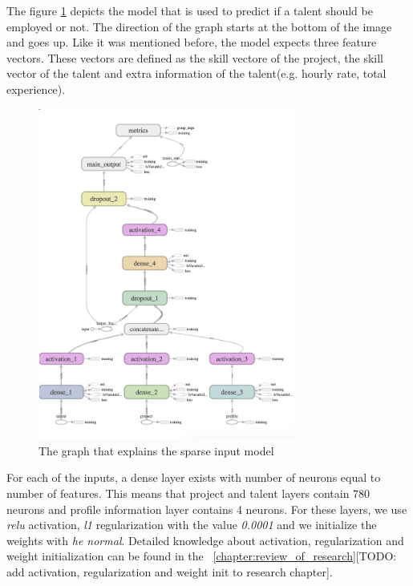 The figure \ref{fig:tensor-board-sparse}  depicts the model that is used to predict if a talent should be employed or not. The direction of the graph starts at the bottom of the image and goes up. Like it was mentioned before, the model expects three feature vectors. These vectors are defined as the skill vectore of the project, the skill vector of the talent and extra information of the talent(e.g. hourly rate, total experience). 

 \begin{figure}[!ht]
	\centering
	\includegraphics[width=0.75\textwidth]{figures/TensorBoardSparseCropped.png}
	\caption{The graph that explains the sparse input model}
	\label{fig:tensor-board-sparse}
\end{figure}

For each of the inputs, a dense layer exists with number of neurons equal to number of features. This means that project and talent layers contain 780 neurons and profile information layer contains 4 neurons. For these layers, we use \textit{relu} activation, \textit{l1} regularization with the value \textit{0.0001} and we initialize the weights with \textit{he normal}. Detailed knowledge about activation, regularization and weight initialization can be found in the ~\autoref{chapter:review_of_research}[TODO: add activation, regularization and weight init to research chapter].



